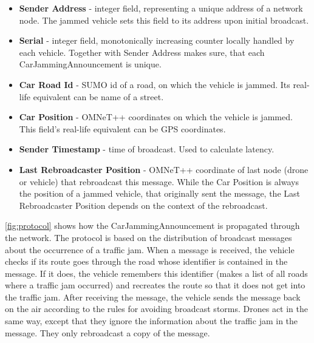 \documentclass[]{nsm-thesis}
\begin{document}
\begin{itemize}

\item \textbf{Sender Address} - integer field, representing a unique address of a network node. The jammed vehicle sets this field to its address upon initial broadcast.

\item \textbf{Serial} - integer field, monotonically increasing counter locally handled by each vehicle. Together with Sender Address makes sure, that each CarJammingAnnouncement is unique.

\item \textbf{Car Road Id} - SUMO id of a road, on which the vehicle is jammed. Its real-life equivalent can be name of a street.

\item \textbf{Car Position} - OMNeT++ coordinates on which the vehicle is jammed. This field's real-life equivalent can be GPS coordinates.

\item \textbf{Sender Timestamp} - time of broadcast. Used to calculate latency.

\item \textbf{Last Rebroadcaster Position} - OMNeT++ coordinate of last node (drone or vehicle) that rebroadcast this message. While the Car Position is always the position of a jammed vehicle, that originally sent the message, the Last Rebroadcaster Position depends on the context of the rebroadcast.

\end{itemize}

\cref{fig:protocol} shows how the CarJammingAnnouncement is propagated through the network. The protocol is based on the distribution of broadcast messages about the occurrence of a traffic jam. When a message is received, the vehicle checks if its route goes through the road whose identifier is contained in the message. If it does, the vehicle remembers this identifier (makes a list of all roads where a traffic jam occurred) and recreates the route so that it does not get into the traffic jam. After receiving the message, the vehicle sends the message back on the air according to the rules for avoiding broadcast storms. Drones act in the same way, except that they ignore the information about the traffic jam in the message. They only rebroadcast a copy of the message.
\end{document}
